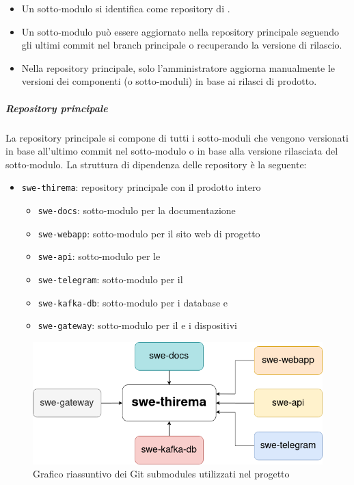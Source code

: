 		\begin{itemize}
			\item Un sotto-modulo si identifica come repository di .
			\item Un sotto-modulo può essere aggiornato nella repository principale seguendo gli ultimi commit nel branch principale o recuperando la versione di rilascio.
			\item Nella repository principale, solo l'amministratore aggiorna manualmente le versioni dei componenti (o sotto-moduli) in base ai rilasci di prodotto.
		\end{itemize}

		\subparagraph{Repository principale}

		La repository principale si compone di tutti i sotto-moduli che vengono versionati in base all'ultimo commit nel sotto-modulo o in base alla versione rilasciata del sotto-modulo.
		La struttura di dipendenza delle repository è la seguente:

		\begin{itemize}
			\item \verb!swe-thirema!: repository principale con il prodotto intero
			\begin{itemize}
				\item \verb!swe-docs!: sotto-modulo per la documentazione
				\item \verb!swe-webapp!: sotto-modulo per il sito web di progetto
				\item \verb!swe-api!: sotto-modulo per le 
				\item \verb!swe-telegram!: sotto-modulo per il 
				\item \verb!swe-kafka-db!: sotto-modulo per i database e 
				\item \verb!swe-gateway!: sotto-modulo per il  e i dispositivi
			\end{itemize}
		\end{itemize}

		\begin{figure}[H]
			\centering
			\includegraphics[scale=0.7]{res/images/submodules}
			\caption{Grafico riassuntivo dei Git submodules utilizzati nel progetto}
		\end{figure}
		
